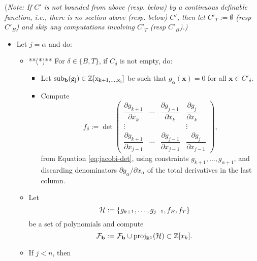 \documentclass[
]{book}
\theoremstyle{definition}
\theoremstyle{definition}
\theoremstyle{definition}
\theoremstyle{definition}
\theoremstyle{remark}
\begin{document}
(\emph{Note: If \(C'\) is not bounded from above (resp. below) by a continuous definable function, i.e., there is no section above (resp. below) \(C'\), then let \(C'_T := \emptyset\) (resp \(C'_B\)) and skip any computations involving \(C'_T\) (resp \(C'_B\)).)}

\begin{itemize}
\item
  Let \(j = \alpha\) and do:

  \begin{itemize}
  \item
    **(*)** For \(\delta \in \{B, T\}\), if \(C_\delta\) is not empty, do:

    \begin{itemize}
    \item
      Let \(\rm{sub}_{\mathbf{b}} (g_j) \in \mathbb{Z}[x_{k+1,\ldots,x_j}]\) be such that \(g_\alpha(\mathbf{x}) = 0\) for all \(\mathbf{x} \in C'_\delta\).
    \item
      Compute
      \[
      f_\delta := \det\begin{pmatrix}\dfrac{\partial g_{k+1}}{\partial x_{k}} & \cdots & \dfrac{\partial g_{j-1}}{\partial x_{k}} & \dfrac{\partial g_{j}}{\partial x_{k}}\\
      \vdots &  &  & \vdots\\
      \dfrac{\partial g_{k+1}}{\partial x_{j-1}} & \cdots & \dfrac{\partial g_{j-1}}{\partial x_{j-1}} & \dfrac{\partial g_{j}}{\partial x_{j-1}}
      \end{pmatrix},
      \]
      from Equation \eqref{eq:jacobi-det}, using constraints \(g_{k+1},\ldots,g_{\alpha+1}\), and discarding denominators \(\partial g_\alpha / \partial x_\alpha\) of the total derivatives in the last column.
    \end{itemize}
  \item
    Let \[{\cal H} := \{ g_{k+1},\ldots,g_{j-1}, f_B, f_T \}\]
    be a set of polynomials and compute
    \[
    {\cal F}_{\mathbf{b}} := {\cal F}_{\mathbf{b}} \cup {\operatorname{proj}_{\mathbb{R}^{1}}}({\cal H}) \subset \mathbb{Z}[x_k].
    \]
  \item
    If \(j < n\), then


\end{itemize}
\end{itemize}
\end{document}
